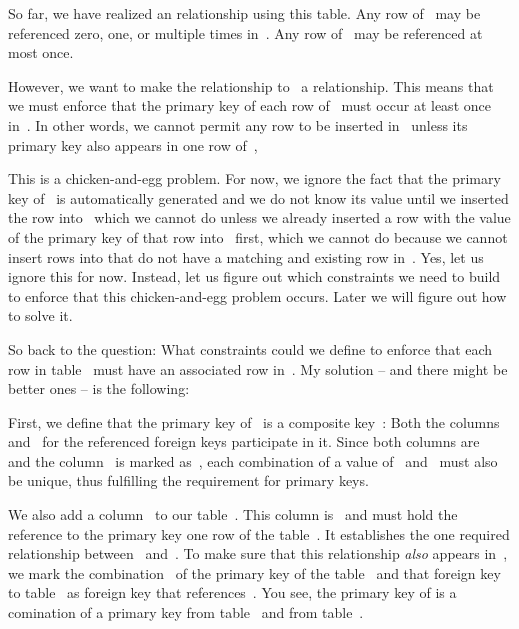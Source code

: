 So far, we have realized an  relationship using this table.
Any row of~ may be referenced zero, one, or multiple times in~.
Any row of~ may be referenced at most once.

However, we want to make the relationship to~ a  relationship.
This means that we must enforce that the primary key of each row of~ must occur at least once in~.
In other words, we cannot permit any row to be inserted in~ unless its primary key also appears in one row of~,

This is a chicken-and-egg problem.
For now, we ignore the fact that the primary key of~ is automatically generated and we do not know its value until we inserted the row into~ which we cannot do unless we already inserted a row with the value of the primary key of that row into~ first, which we cannot do because we cannot insert rows into  that do not have a matching and existing row in~.
Yes, let us ignore this for now.
Instead, let us figure out which constraints we need to build to enforce that this chicken-and-egg problem occurs.
Later we will figure out how to solve it.

So back to the question:
What constraints could we define to enforce that each row in table~ must have an associated row in~.
My solution -- and there might be better ones -- is the following:

First, we define that the primary key of~ is a composite key~:
Both the columns~ and~ for the referenced foreign keys participate in it.
Since both columns are~ and the column~ is marked as~, each combination of a value of~ and~ must also be unique, thus fulfilling the requirement for primary keys.

We also add a column~ to our table~.
This column is~ and must hold the reference to the primary key one row of the table~.
It establishes the one required relationship between~ and~.
To make sure that this relationship \emph{also} appears in~, we mark the combination~ of the primary key of the table~ and that foreign key to table~ as foreign key that references~.
You see, the primary key of  is a comination of a primary key from table~ and from table~.

